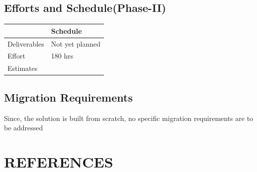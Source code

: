 \documentclass[11pt]{article}
\begin{document}
\subsection{Efforts and Schedule(Phase-II)}
\label{sec-11.2}




\begin{center}
\begin{tabular}{ll}
\hline
               &  Schedule         \\
\hline
 Deliverables  &  Not yet planned  \\
\hline
 Effort        &  180 hrs          \\
 Estimates     &                   \\
\hline
\end{tabular}
\end{center}



\subsection{Migration Requirements}
\label{sec-11.3}

   Since, the solution is built from scratch, no specific migration requirements
   are to be addressed
\section{REFERENCES}
\label{sec-12}
\end{document}
